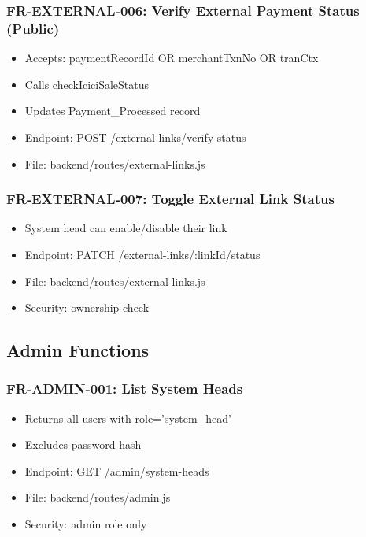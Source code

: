 \documentclass[12pt,a4paper]{article}
\begin{document}
\subsubsection{FR-EXTERNAL-006: Verify External Payment Status (Public)}
\begin{itemize}
  \item Accepts: paymentRecordId OR merchantTxnNo OR tranCtx
  \item Calls checkIciciSaleStatus
  \item Updates Payment\_Processed record
  \item Endpoint: POST /external-links/verify-status
  \item File: backend/routes/external-links.js
\end{itemize}

\subsubsection{FR-EXTERNAL-007: Toggle External Link Status}
\begin{itemize}
  \item System head can enable/disable their link
  \item Endpoint: PATCH /external-links/:linkId/status
  \item File: backend/routes/external-links.js
  \item Security: ownership check
\end{itemize}

\subsection{Admin Functions}

\subsubsection{FR-ADMIN-001: List System Heads}
\begin{itemize}
  \item Returns all users with role='system\_head'
  \item Excludes password hash
  \item Endpoint: GET /admin/system-heads
  \item File: backend/routes/admin.js
  \item Security: admin role only
\end{itemize}
\end{document}

